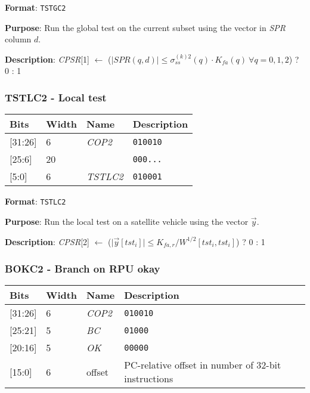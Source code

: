 \documentclass[11pt]{article}
\begin{document}
\textbf{Format}: \texttt{TSTGC2}

\textbf{Purpose}: Run the global test on the current subset using the vector in \emph{SPR} column $d$.

\textbf{Description}: \emph{CPSR}[1] $\leftarrow$ ($|SPR(q,d)| \le \sigma_{ss}^{(k)2}(q) \cdot K_{fa}(q)\ \forall q = 0,1,2$) ? 0 : 1

\text{}
\subsubsection{TSTLC2 - Local test}
\text{}

\begin{table}[H] \centering
  \def\arraystretch{1.4}
  \begin{tabular}{|m{2cm}|m{1.5cm}|m{2.5cm}|m{4.5cm}|}
    \hline
    \textbf{Bits} & \textbf{Width} & \textbf{Name} & \textbf{Description}\\ \hline

    [31:26] & 6 & \emph{COP2} & \texttt{010010}\\ \hline

    [25:6] & 20 & & \texttt{000...}\\ \hline

    [5:0] & 6 & \emph{TSTLC2} & \texttt{010001}\\ \hline
  \end{tabular}
\end{table}

\textbf{Format}: \texttt{TSTLC2}

\textbf{Purpose}: Run the local test on a satellite vehicle using the vector $\vec{y}$.

\textbf{Description}: \emph{CPSR}[2] $\leftarrow$ ($\vert\vec{y}[tst_i]\vert \le K_{fa,r}/W^{1/2}[tst_i,tst_i]$) ? 0 : 1

\text{}
\subsubsection{BOKC2 - Branch on RPU okay}
\text{}

\begin{table}[H] \centering
  \def\arraystretch{1.4}
  \begin{tabular}{|m{2cm}|m{1.5cm}|m{2.5cm}|m{4.5cm}|}
    \hline
    \textbf{Bits} & \textbf{Width} & \textbf{Name} & \textbf{Description}\\ \hline

    [31:26] & 6 & \emph{COP2} & \texttt{010010}\\ \hline

    [25:21] & 5 & \emph{BC} & \texttt{01000}\\ \hline

    [20:16] & 5 & \emph{OK} & \texttt{00000}\\ \hline

    [15:0] & 6 & offset & PC-relative offset in number of 32-bit instructions\\ \hline
  \end{tabular}
\end{table}
\end{document}
